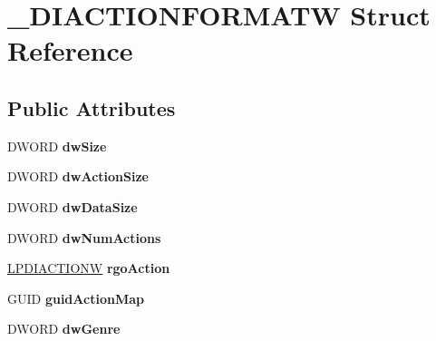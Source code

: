 \hypertarget{struct___d_i_a_c_t_i_o_n_f_o_r_m_a_t_w}{\section{\-\_\-\-D\-I\-A\-C\-T\-I\-O\-N\-F\-O\-R\-M\-A\-T\-W Struct Reference}
\label{struct___d_i_a_c_t_i_o_n_f_o_r_m_a_t_w}
}
\subsection*{Public Attributes}
\begin{DoxyCompactItemize}
\item 
\hypertarget{struct___d_i_a_c_t_i_o_n_f_o_r_m_a_t_w_a57d725bf5b4f4eca4b507abd512e42ea}{D\-W\-O\-R\-D {\bfseries dw\-Size}}\label{struct___d_i_a_c_t_i_o_n_f_o_r_m_a_t_w_a57d725bf5b4f4eca4b507abd512e42ea}

\item 
\hypertarget{struct___d_i_a_c_t_i_o_n_f_o_r_m_a_t_w_a6e88754a8445e8d3fa25151c7f5f2d0b}{D\-W\-O\-R\-D {\bfseries dw\-Action\-Size}}\label{struct___d_i_a_c_t_i_o_n_f_o_r_m_a_t_w_a6e88754a8445e8d3fa25151c7f5f2d0b}

\item 
\hypertarget{struct___d_i_a_c_t_i_o_n_f_o_r_m_a_t_w_aade5e9d6c4bfeafdfee2e73cc196b948}{D\-W\-O\-R\-D {\bfseries dw\-Data\-Size}}\label{struct___d_i_a_c_t_i_o_n_f_o_r_m_a_t_w_aade5e9d6c4bfeafdfee2e73cc196b948}

\item 
\hypertarget{struct___d_i_a_c_t_i_o_n_f_o_r_m_a_t_w_a9077c247d953a9918018b1c7a956f932}{D\-W\-O\-R\-D {\bfseries dw\-Num\-Actions}}\label{struct___d_i_a_c_t_i_o_n_f_o_r_m_a_t_w_a9077c247d953a9918018b1c7a956f932}

\item 
\hypertarget{struct___d_i_a_c_t_i_o_n_f_o_r_m_a_t_w_a485c0753b8c3bdb1ce1f1bc5f1222036}{\hyperlink{struct___d_i_a_c_t_i_o_n_w}{L\-P\-D\-I\-A\-C\-T\-I\-O\-N\-W} {\bfseries rgo\-Action}}\label{struct___d_i_a_c_t_i_o_n_f_o_r_m_a_t_w_a485c0753b8c3bdb1ce1f1bc5f1222036}

\item 
\hypertarget{struct___d_i_a_c_t_i_o_n_f_o_r_m_a_t_w_ababfc75194f2ea9bf6bc082b61fc7e38}{G\-U\-I\-D {\bfseries guid\-Action\-Map}}\label{struct___d_i_a_c_t_i_o_n_f_o_r_m_a_t_w_ababfc75194f2ea9bf6bc082b61fc7e38}

\item 
\hypertarget{struct___d_i_a_c_t_i_o_n_f_o_r_m_a_t_w_af2215c245b2bf5029cab678829df3fb4}{D\-W\-O\-R\-D {\bfseries dw\-Genre}}\label{struct___d_i_a_c_t_i_o_n_f_o_r_m_a_t_w_af2215c245b2bf5029cab678829df3fb4}


\end{DoxyCompactItemize}
